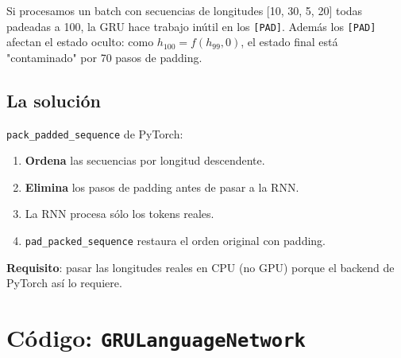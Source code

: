 Si procesamos un batch con secuencias de longitudes [10, 30, 5,
20] todas padeadas a 100, la GRU hace trabajo inútil en los
\texttt{[PAD]}. Además los \texttt{[PAD]} afectan el estado
oculto: como $h_{100} = f(h_{99}, 0)$, el estado final está
"contaminado" por 70 pasos de padding.

\subsection{La solución}

\texttt{pack\_padded\_sequence} de PyTorch:

\begin{enumerate}
  \item \textbf{Ordena} las secuencias por longitud descendente.
  \item \textbf{Elimina} los pasos de padding antes de pasar a
        la RNN.
  \item La RNN procesa sólo los tokens reales.
  \item \texttt{pad\_packed\_sequence} restaura el orden original
        con padding.
\end{enumerate}

\noindent\textbf{Requisito}: pasar las longitudes reales en CPU
(no GPU) porque el backend de PyTorch así lo requiere.

\section{Código: \texttt{GRULanguageNetwork}}

